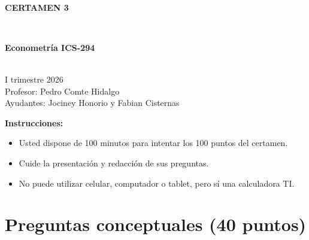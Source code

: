 \documentclass[10pt,a4paper]{article}
\begin{document}
\vspace{5cm}



\begin{center}
\begin{large}
\textbf{\\CERTAMEN 3}
\end{large}\\
\end{center}

\begin{center}
\begin{large}
\textbf{Econometría ICS-294}
\end{large}\\
\vspace{0.2cm}
I trimestre 2026\\
Profesor: Pedro Comte Hidalgo\\
Ayudantes: Jociney Honorio y Fabian Cisternas
\end{center}

\textbf{Instrucciones:} 

\begin{itemize}

    \item Usted dispone de 100 minutos  para intentar los 100 puntos del certamen.
    \item Cuide la presentación y redacción de sus preguntas.
    \item No puede utilizar celular, computador o tablet, pero sí una calculadora TI.
     
\end{itemize}

\section{Preguntas conceptuales (40 puntos)}
\end{document}

